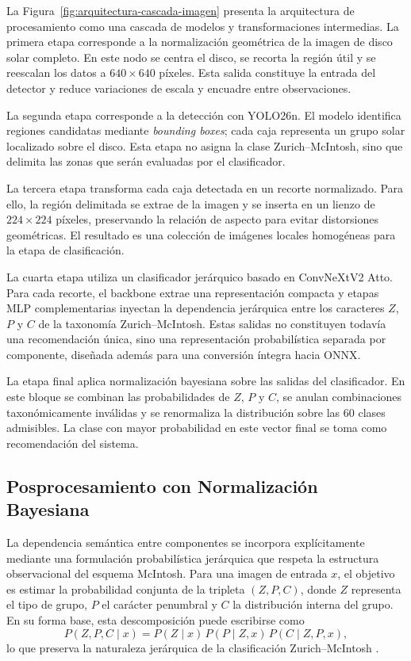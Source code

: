La Figura~\ref{fig:arquitectura-cascada-imagen} presenta la arquitectura de
procesamiento como una cascada de modelos y transformaciones intermedias. La primera etapa corresponde a la normalización geométrica de la imagen de disco
solar completo. En este nodo se centra el disco, se recorta la región útil y se
reescalan los datos a $640\times640$ píxeles. Esta salida constituye la entrada
del detector y reduce variaciones de escala y encuadre entre observaciones.

La segunda etapa corresponde a la detección con YOLO26n. El modelo identifica
regiones candidatas mediante \textit{bounding boxes}; cada caja representa un
grupo solar localizado sobre el disco. Esta etapa no asigna la clase
Zurich--McIntosh, sino que delimita las zonas que serán evaluadas por el
clasificador.

La tercera etapa transforma cada caja detectada en un recorte normalizado. Para
ello, la región delimitada se extrae de la imagen y se inserta en un lienzo de
$224\times224$ píxeles, preservando la relación de aspecto para evitar
distorsiones geométricas. El resultado es una colección de imágenes locales
homogéneas para la etapa de clasificación.

La cuarta etapa utiliza un clasificador jerárquico basado en ConvNeXtV2 Atto. Para
cada recorte, el backbone extrae una representación compacta y etapas MLP
complementarias inyectan la dependencia jerárquica entre los caracteres $Z$, $P$
y $C$ de la taxonomía Zurich--McIntosh. Estas salidas no constituyen todavía una
recomendación única, sino una representación probabilística separada por
componente, diseñada además para una conversión íntegra hacia ONNX.

La etapa final aplica normalización bayesiana sobre las salidas del
clasificador. En este bloque se combinan las probabilidades de $Z$, $P$ y $C$, se
anulan combinaciones taxonómicamente inválidas y se renormaliza la distribución
sobre las 60 clases admisibles. La clase con mayor probabilidad en este vector
final se toma como recomendación del sistema.

\subsection{Posprocesamiento con Normalización Bayesiana}

\label{sec:classification}

La dependencia semántica entre componentes se incorpora explícitamente mediante una formulación probabilística jerárquica que respeta la estructura observacional del esquema McIntosh. Para una imagen de entrada $x$, el objetivo es estimar la probabilidad conjunta de la tripleta $(Z,P,C)$, donde $Z$ representa el tipo de grupo, $P$ el carácter penumbral y $C$ la distribución interna del grupo. En su forma base, esta descomposición puede escribirse como
\begin{equation}
P(Z,P,C\mid x)=P(Z\mid x)\,P(P\mid Z,x)\,P(C\mid Z,P,x),
\end{equation}
lo que preserva la naturaleza jerárquica de la clasificación Zurich--McIntosh \citep{mcintosh1990classification}.


